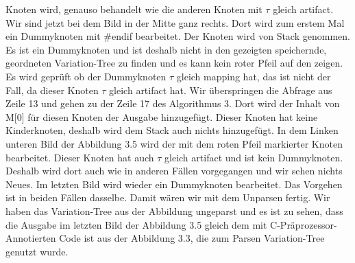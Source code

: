 Knoten wird, genauso behandelt wie die anderen Knoten mit $\tau$ gleich artifact. Wir sind jetzt bei dem Bild in der Mitte ganz rechts. Dort wird zum erstem Mal ein Dummyknoten mit \#endif bearbeitet. Der Knoten wird von Stack genommen. Es ist ein Dummyknoten und ist deshalb nicht in den gezeigten speichernde, geordneten Variation-Tree zu finden und es kann kein roter Pfeil auf den zeigen. Es wird geprüft ob der Dummyknoten $\tau$ gleich mapping hat, das ist nicht der Fall, da dieser Knoten $\tau$ gleich artifact hat. Wir überspringen die Abfrage aus Zeile 13 und gehen zu der Zeile 17 des Algorithmus 3. Dort wird der Inhalt von M[0] für diesen Knoten der Ausgabe hinzugefügt. Dieser Knoten hat keine Kinderknoten, deshalb wird dem Stack auch nichts hinzugefügt. In dem Linken unteren Bild der Abbildung 3.5 wird der mit dem roten Pfeil markierter Knoten bearbeitet. Dieser Knoten hat auch $\tau$ gleich artifact und ist kein Dummyknoten. Deshalb wird dort auch wie in anderen Fällen vorgegangen und wir sehen nichts Neues. Im letzten Bild wird wieder ein Dummyknoten bearbeitet. Das Vorgehen ist in beiden Fällen dasselbe. Damit wären wir mit dem Unparsen fertig. Wir haben das Variation-Tree aus der Abbildung ungeparst und es ist zu sehen, dass die Ausgabe im letzten Bild der Abbildung 3.5 gleich dem mit C-Präprozessor-Annotierten Code ist aus der Abbildung 3.3, die zum Parsen  Variation-Tree genutzt wurde.



